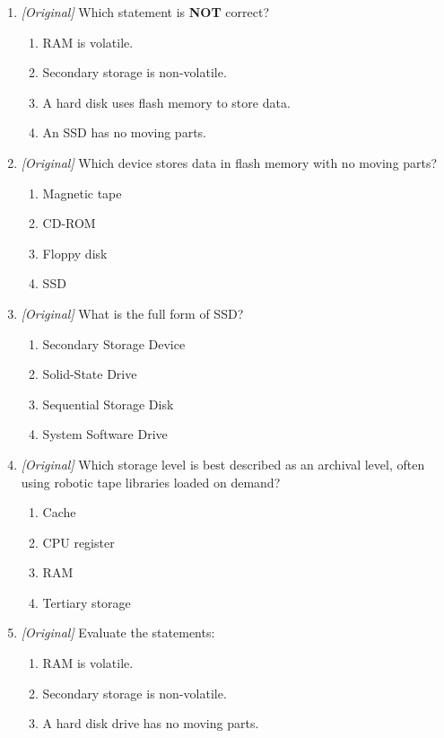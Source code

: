 \begin{enumerate}[label=\textbf{Q\arabic*.}, leftmargin=*]
\item \textit{[Original]} Which statement is \textbf{NOT} correct?
  \begin{enumerate}[label=\Alph*.]
    \item RAM is volatile.
    \item Secondary storage is non-volatile.
    \item A hard disk uses flash memory to store data.
    \item An SSD has no moving parts.
  \end{enumerate}
\item \textit{[Original]} Which device stores data in flash memory with no
  moving parts?
  \begin{enumerate}[label=\Alph*.]
    \item Magnetic tape
    \item CD-ROM
    \item Floppy disk
    \item SSD
  \end{enumerate}
\item \textit{[Original]} What is the full form of SSD?
  \begin{enumerate}[label=\Alph*.]
    \item Secondary Storage Device
    \item Solid-State Drive
    \item Sequential Storage Disk
    \item System Software Drive
  \end{enumerate}
\item \textit{[Original]} Which storage level is best described as an
  archival level, often using robotic tape libraries loaded on demand?
  \begin{enumerate}[label=\Alph*.]
    \item Cache
    \item CPU register
    \item RAM
    \item Tertiary storage
  \end{enumerate}
\item \textit{[Original]} Evaluate the statements:
  \begin{enumerate}[label=\Roman*.]
    \item RAM is volatile.
    \item Secondary storage is non-volatile.
    \item A hard disk drive has no moving parts.
  \end{enumerate}

\end{enumerate}
